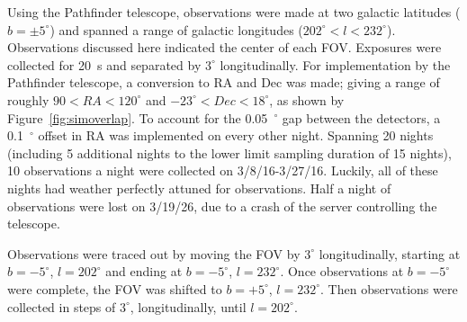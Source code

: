 \documentclass[aps,prb,twocolumn,superscriptaddress]{revtex4-1}
\begin{document}


Using the Pathfinder telescope, observations were made at two galactic latitudes ($b=\pm5^{\circ}$) and spanned a range of galactic longitudes ($202^{\circ} < l < 232^{\circ}$).  Observations discussed here indicated the center of each FOV.  
Exposures were collected for 20~s and separated by $3^{\circ}$ longitudinally.  For implementation by the Pathfinder telescope, a conversion to RA and Dec was made; giving a range of roughly $90 < RA < 120^{\circ}$ and $-23^{\circ} < Dec < 18^{\circ}$, as shown by Figure~\ref{fig:simoverlap}.  To account for the 0.05~$^{\circ}$ gap between the detectors, a 0.1~$^{\circ}$ offset in RA was implemented on every other night.  
Spanning 20 nights (including 5 additional nights to the lower limit sampling duration of 15 nights), 10 observations a night were collected on 3/8/16-3/27/16.  Luckily, all of these nights had weather perfectly attuned for observations.  Half a night of observations were lost on 3/19/26, due to a crash of the server controlling the telescope.


Observations were traced out by moving the FOV by $3^{\circ}$ longitudinally, starting at $b=-5^{\circ}$, $l=202^{\circ}$ and ending at $b=-5^{\circ}$, $l=232^{\circ}$.  Once observations at $b=-5^{\circ}$ were complete, the FOV was shifted to $b=+5^{\circ}$, $l=232^{\circ}$. Then observations were collected in steps of $3^{\circ}$, longitudinally, until $l = 202 ^{\circ}$. 
\end{document}
